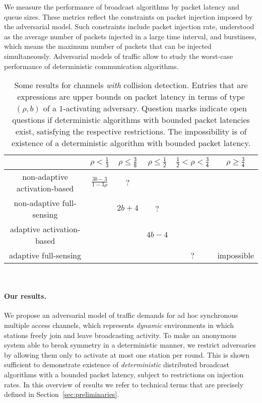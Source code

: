 \documentclass[11pt]{article}
\newcommand{\BBB}{\vspace*{-\bigskipamount}}
\newcommand{\Paragraph}[1]{\BBB\paragraph{#1}}
\newlength{\pagewidth}
\newcommand{\RB}{\raisebox{2.5ex}{~}}
\newcommand{\LB}{\raisebox{-1.5ex}{~}}
\begin{document}
We measure the performance of broadcast algorithms by packet latency and queue sizes. 
These metrics reflect the constraints on packet injection imposed by the adversarial model.
Such constraints include packet injection rate, understood as the average number of packets injected in a large time interval, and burstiness, which means the maximum number of packets that can be injected simultaneously.
Adversarial models of traffic allow to study the worst-case performance of deterministic communication algorithms.




\begin{table}
\begin{center}
\begin{tabular}{|c ||c |c |c |c |c |}
\hline
\RB \LB
& $\mathsf{\rho < \frac{1}{3}}$ & $\mathsf{\rho \le \frac{3}{8}}$ & $\mathsf{\rho \le \frac{1}{2}}$ 
&$\mathsf{\frac{1}{2}<\rho < \frac{3}{4}}$&$\mathsf{\rho \ge \frac{3}{4}}$\\
\hline\hline
\RB \LB
\textsf{non-adaptive activation-based } & $\frac{3b-3}{1-3\rho}$ & ? &  && \\
\hline
\RB
\textsf{non-adaptive full-sensing }&& $2b +4$ & ? && \\
\hline
\RB \LB
\textsf{adaptive activation-based } & & &$4b-4$&& \\
\hline
\RB \LB
\textsf{adaptive full-sensing } & & &&?& impossible\\
\hline
\end{tabular}
\parbox{\pagewidth}{
~
\caption{\label{tab:collision-detection}
Some results for channels \emph{with} collision detection.
Entries that are expressions are upper bounds on packet latency in terms of type $(\rho,b)$ of a $1$-activating adversary.
Question marks indicate open questions  if deterministic algorithms with bounded packet latencies exist, satisfying the respective restrictions.
The impossibility is of existence of a deterministic algorithm with bounded packet latency.
}}
\end{center}
\end{table}




\Paragraph{Our results.}




We propose an adversarial model of traffic demands for ad hoc synchronous multiple access channels, which represents \emph{dynamic} environments in which stations freely join and leave broadcasting activity.
To make an anonymous system able to break symmetry in a deterministic manner, we restrict adversaries by allowing them only to activate at most one station per round.
This is shown sufficient to demonstrate existence of \emph{deterministic} distributed broadcast algorithms with a bounded packet latency, subject to restrictions on injection rates.
In this overview of results we refer to technical terms that are precisely defined in Section~\ref{sec:preliminaries}.
\end{document}
